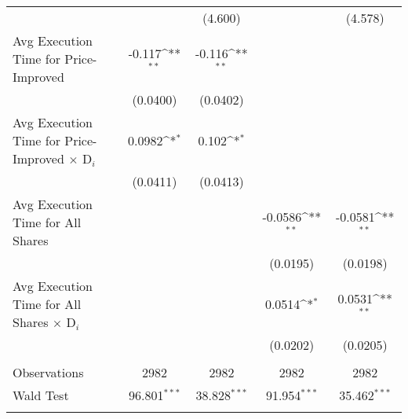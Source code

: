 \documentclass[11pt]{beamer}
\def\sym#1{\ifmmode^{#1}\else\(^{#1}\)\fi}
\begin{document}
\begin{frame}
{\begin{table}[!htbp]
\begin{tabular}{@{\extracolsep{0.5em}}lcccc}
		&                     &     (4.600)         &                     &     (4.578)         \\
		Avg Execution Time for Price-Improved  &      -0.117\sym{**} &      -0.116\sym{**} &                     &                     \\
		&    (0.0400)         &    (0.0402)         &                     &                     \\
		Avg Execution Time for Price-Improved  $\times$ D$_i$ &      0.0982\sym{*}  &       0.102\sym{*}  &                     &                     \\
		&    (0.0411)         &    (0.0413)         &                     &                     \\
		Avg Execution Time for All Shares      &                     &                     &     -0.0586\sym{**} &     -0.0581\sym{**} \\
		&                     &                     &    (0.0195)         &    (0.0198)         \\
		Avg Execution Time for All Shares  $\times$ D$_i$ &                     &                     &      0.0514\sym{*}  &      0.0531\sym{**} \\
		&                     &                     &    (0.0202)         &    (0.0205)         \\	
		\hline \\[-1.8ex] 
		Observations &        2982         &        2982         &        2982         &        2982         \\
		Wald Test & 96.801$^{***}$ & 38.828$^{***}$ & 91.954$^{***}$ & 35.462$^{***}$ \\  
		\hline 
		\hline \\[-1.8ex] 
	\end{tabular} 
\end{table} 
}
\end{frame}
\end{document}

